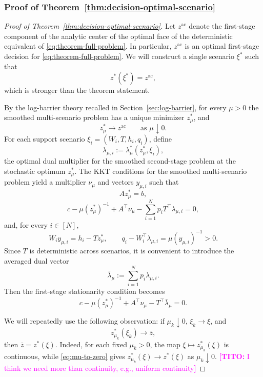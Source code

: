 \documentclass{article}
\newcommand{\thc}[1]{\textcolor{magenta}{\textbf{[TITO:} #1\textbf{]}}}
\theoremstyle{plain}
\theoremstyle{definition}
\theoremstyle{remark}
\begin{document}
\subsubsection{Proof of Theorem~\ref{thm:decision-optimal-scenario}}
\begin{proof}[Proof of Theorem~\ref{thm:decision-optimal-scenario}]
Let $z^{\mathrm{ac}}$ denote the first-stage component of the analytic center of the optimal face of the deterministic equivalent of \eqref{eq:theorem-full-problem}. In particular, $z^{\mathrm{ac}}$ is an optimal first-stage decision for \eqref{eq:theorem-full-problem}. We will construct a single scenario $\xi^*$ such that
\[
z^*(\xi^*)=z^{\mathrm{ac}},
\]
which is stronger than the theorem statement.

By the log-barrier theory recalled in Section~\ref{sec:log-barrier}, for every $\mu>0$ the smoothed multi-scenario problem has a unique minimizer $z_\mu^*$, and
\[
z_\mu^* \longrightarrow z^{\mathrm{ac}}
\qquad\text{as }\mu\downarrow 0.
\]
For each support scenario $\xi_i=(W_i,T,h_i,q_i)$, define
\[
\lambda_{\mu,i}:=\lambda_\mu^*(z_\mu^*,\xi_i),
\]
the optimal dual multiplier for the smoothed second-stage problem at the stochastic optimum $z_\mu^*$. The KKT conditions for the smoothed multi-scenario problem yield a multiplier $\nu_\mu$ and vectors $y_{\mu,i}$ such that
\[
Az_\mu^*=b,
\]
\[
c-\mu (z_\mu^*)^{-1}+A^\top \nu_\mu-\sum_{i=1}^N p_iT^\top \lambda_{\mu,i}=0,
\]
and, for every $i\in[N]$,
\[
W_i y_{\mu,i}=h_i-Tz_\mu^*,
\qquad
q_i-W_i^\top \lambda_{\mu,i}=\mu (y_{\mu,i})^{-1}>0.
\]
Since $T$ is deterministic across scenarios, it is convenient to introduce the averaged dual vector
\[
\bar\lambda_\mu:=\sum_{i=1}^N p_i\lambda_{\mu,i}.
\]
Then the first-stage stationarity condition becomes
\[
c-\mu (z_\mu^*)^{-1}+A^\top \nu_\mu-T^\top \bar\lambda_\mu=0.
\]

We will repeatedly use the following observation: if $\mu_k\downarrow 0$, $\xi_k\to \xi$, and
\[
z_{\mu_k}^*(\xi_k)\to \bar z,
\]
then $\bar z=z^*(\xi)$. Indeed, for each fixed $\mu_k>0$, the map $\xi\mapsto z_{\mu_k}^*(\xi)$ is continuous, while \eqref{eq:mu-to-zero} gives $z_{\mu_k}^*(\xi)\to z^*(\xi)$ as $\mu_k\downarrow 0$. \thc{I think we need more than continuity, e.g., uniform continuity}


\end{proof}
\end{document}
